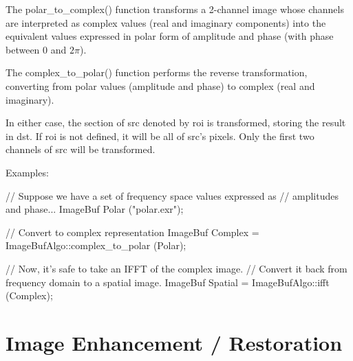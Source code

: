  
 

The {\cf polar_to_complex()} function transforms a 2-channel image whose
channels are interpreted as complex values (real and imaginary components)
into the equivalent values expressed in polar form of amplitude and phase
(with phase between $0$ and $2\pi$).

The {\cf complex_to_polar()} function performs the reverse transformation,
converting from  polar values (amplitude and phase) to complex (real and
imaginary).

In either case,  the section of {\cf src} denoted by {\cf roi} is
transformed, storing the result in {\cf dst}. If {\cf roi} is not defined,
it will be all of {\cf src}'s pixels.  Only the first two channels of {\cf
src} will be transformed.

\smallskip
\noindent Examples:
\begin{code}
    // Suppose we have a set of frequency space values expressed as
    // amplitudes and phase...
    ImageBuf Polar ("polar.exr");

    // Convert to complex representation
    ImageBuf Complex = ImageBufAlgo::complex_to_polar (Polar);

    // Now, it's safe to take an IFFT of the complex image.
    // Convert it back from frequency domain to a spatial image.
    ImageBuf Spatial = ImageBufAlgo::ifft (Complex);
\end{code}
\apiend



\section{Image Enhancement / Restoration}
\label{sec:iba:enhance}

